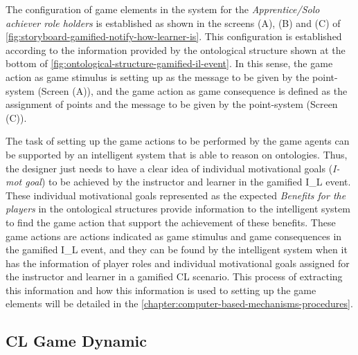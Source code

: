 The configuration of game elements in the system for the \emph{Apprentice/Solo achiever role holders} is established as shown in the screens (A), (B) and (C) of \autoref{fig:storyboard-gamified-notify-how-learner-is}. This configuration is established according to the information provided by the ontological structure shown at the bottom of \autoref{fig:ontological-structure-gamified-il-event}. In this sense, the game action  as game stimulus is setting up as the message  to be given by the point-system (Screen (A)), and the game action  as game consequence is defined as the assignment of points and the message to be given by the point-system (Screen (C)).

The task of setting up the game actions to be performed by the game agents can be supported by an intelligent system that is able to reason on ontologies. Thus, the designer just needs to have a clear idea of individual motivational goals (\emph{I-mot goal}) to be achieved by the instructor and learner in the gamified I\_L event. These individual motivational goals represented as the expected \emph{Benefits for the players} in the ontological structures provide information to the intelligent system to find the game action that support the achievement of these benefits. These game actions are actions indicated as game stimulus and game consequences in the gamified I\_L event, and they can be found by the intelligent system when it has the information of player roles and individual motivational goals assigned for the instructor and learner in a gamified CL scenario. This process of extracting this information and how this information is used to setting up the game elements will be detailed in the \autoref{chapter:computer-based-mechanisms-procedures}.

\subsection{CL Game Dynamic}
\label{subsec:cl-game-dynamic}

